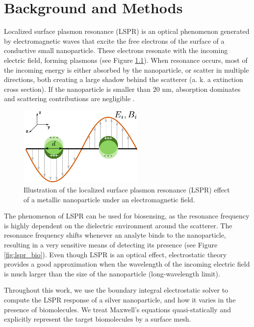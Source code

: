 
\chapter{Background and Methods} \label{chap:methods}
\graphicspath{{methods/figs/}}


Localized surface plasmon resonance (LSPR) is an optical phenomenon generated by electromagnetic waves 
that excite the free electrons of the surface of a conductive small nanoparticle. These electrons resonate  
with the incoming electric field, forming plasmons (see Figure \ref{fig:lspr}). When resonance occurs, 
most of the incoming energy is either absorbed by the nanoparticle, or scatter in multiple directions, both
creating a large shadow behind the scatterer (a. k. a extinction cross section). If the nanoparticle is 
smaller than $20$ nm, absorption dominates and scattering contributions are negligible \cite{PetryayevaKrull2011, OlsonETal2015}.

\begin{figure}
   \centering
     \includegraphics[width=0.55\textwidth]{lspr.pdf} 
     \caption{Illustration of the localized surface plasmon resonance (LSPR) effect of a metallic nanoparticle under an electromagnetic field.}
     \label{fig:lspr}
\end{figure}

The phenomenon of LSPR can be used for biosensing, as the resonance frequency is highly dependent on the dielectric environment 
around the scatterer. The resonance frequency shifts whenever an analyte binds to the nanoparticle, 
resulting in a very sensitive means of detecting its presence \cite{HaesVanduyne2002,HaesETal2004}
(see Figure \ref{fig:lspr_bio}). Even though LSPR is an optical effect, electrostatic theory
provides a good approximation when the wavelength of the incoming electric field is much larger than 
the size of the nanoparticle (long-wavelength limit). 

Throughout this work, we use the boundary integral electrostatic solver \pygbe \cite{ClementiETal2017} to compute 
the LSPR response of a silver nanoparticle, and how it varies in the presence of biomolecules. We treat Maxwell's equations
quasi-statically \cite{MayergoyzZhang2007} and explicitly represent the target biomolecules by a surface mesh.

